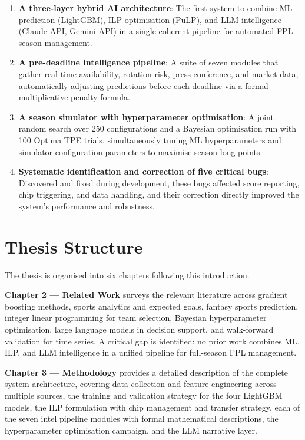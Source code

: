 \begin{enumerate}
  \item \textbf{A three-layer hybrid AI architecture}: The first system to combine ML prediction (LightGBM), ILP optimisation (PuLP), and LLM intelligence (Claude API, Gemini API) in a single coherent pipeline for automated FPL season management.

  \item \textbf{A pre-deadline intelligence pipeline}: A suite of seven modules that gather real-time availability, rotation risk, press conference, and market data, automatically adjusting predictions before each deadline via a formal multiplicative penalty formula.

  \item \textbf{A season simulator with hyperparameter optimisation}: A joint random search over 250 configurations and a Bayesian optimisation run with 100 Optuna TPE trials, simultaneously tuning ML hyperparameters and simulator configuration parameters to maximise season-long points.

  \item \textbf{Systematic identification and correction of five critical bugs}: Discovered and fixed during development, these bugs affected score reporting, chip triggering, and data handling, and their correction directly improved the system's performance and robustness.
\end{enumerate}

\section{Thesis Structure}

The thesis is organised into six chapters following this introduction.

\textbf{Chapter 2 — Related Work} surveys the relevant literature across gradient boosting methods, sports analytics and expected goals, fantasy sports prediction, integer linear programming for team selection, Bayesian hyperparameter optimisation, large language models in decision support, and walk-forward validation for time series. A critical gap is identified: no prior work combines ML, ILP, and LLM intelligence in a unified pipeline for full-season FPL management.

\textbf{Chapter 3 — Methodology} provides a detailed description of the complete system architecture, covering data collection and feature engineering across multiple sources, the training and validation strategy for the four LightGBM models, the ILP formulation with chip management and transfer strategy, each of the seven intel pipeline modules with formal mathematical descriptions, the hyperparameter optimisation campaign, and the LLM narrative layer.

